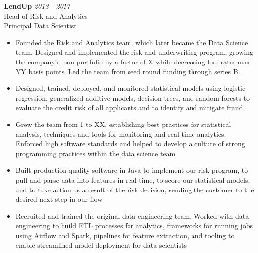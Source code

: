 \documentclass[9pt]{article}
\newenvironment{changemargin}[2]{%
  \begin{list}{}{%
    \setlength{\topsep}{0pt}%
    \setlength{\leftmargin}{#1}%
    \setlength{\rightmargin}{#2}%
    \setlength{\listparindent}{\parindent}%
    \setlength{\itemindent}{\parindent}%
    \setlength{\parsep}{\parskip}%
  }%
  \item[]}{\end{list}
}
\newenvironment{body} {
  \vspace*{-16pt}
\begin{changemargin}{-0.25in}{-0.5in}
  }
{\end{changemargin}
}
\begin{document}
\begin{body}

  \vspace{14pt}

  \textbf{LendUp} \hfill \emph{2013 - 2017}\\
  Head of Risk and Analytics \\
  Principal Data Scientist
  \begin{itemize}

    \item Founded the Risk and Analytics team, which later became the Data Science team.  Designed and implemented the risk and underwriting program, growing the company's loan portfolio by a factor of X while decreasing loss rates over YY basis points.  Led the team from seed round funding through series B. \\

    \item Designed, trained, deployed, and monitored statistical models using logistic regression, generalized additive models, decision trees, and random forests to evaluate the credit risk of all applicants and to identify and mitigate fraud. \\

    \item Grew the team from 1 to XX, establishing best practices for statistical analysis, techniques and tools for monitoring and real-time analytics.  Enforced high software standards and helped to develop a culture of strong programming practices within the data science team \\

    \item Built production-quality software in Java to implement our risk program, to pull and parse data into features in real time, to score our statistical models, and to take action as a result of the risk decision, sending the customer to the desired next step in our flow \\

    \item Recruited and trained the original data engineering team.  Worked with data engineering to build ETL processes for analytics, frameworks for running jobs using Airflow and Spark, pipelines for feature extraction, and tooling to enable streamlined model deployment for data scientists \\
        \end{itemize}

        \medskip


\end{body}
\end{document}
